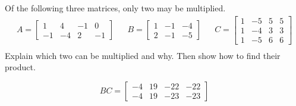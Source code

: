 
\begin{exerciseStatement}


Of the following three matrices, only two may be multiplied. 
\begin{align*} A= \left[\begin{array}{cccc}
1 & 4 & -1 & 0 \\
-1 & -4 & 2 & -1
\end{array}\right]  & & B= \left[\begin{array}{ccc}
1 & -1 & -4 \\
2 & -1 & -5
\end{array}\right]  & & C= \left[\begin{array}{cccc}
1 & -5 & 5 & 5 \\
1 & -4 & 3 & 3 \\
1 & -5 & 6 & 6
\end{array}\right]  \\ \end{align*}
             Explain which two can be multiplied and why. Then show how to find their product.


\end{exerciseStatement}
    
\begin{exerciseAnswer} 
\[BC= \left[\begin{array}{cccc}
-4 & 19 & -22 & -22 \\
-4 & 19 & -23 & -23
\end{array}\right] \]
\end{exerciseAnswer}
    
